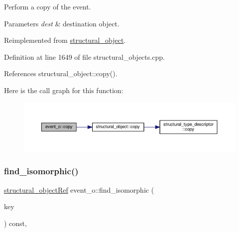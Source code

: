 Perform a copy of the event. 


\begin{DoxyParams}{Parameters}
{\em dest} & destination object. \\
\hline
\end{DoxyParams}


Reimplemented from \hyperlink{classstructural__object_a6566435c67934f6b4ff1b319c0682b18}{structural\+\_\+object}.



Definition at line 1649 of file structural\+\_\+objects.\+cpp.



References structural\+\_\+object\+::copy().

Here is the call graph for this function\+:
\nopagebreak
\begin{figure}[H]
\begin{center}
\leavevmode
\includegraphics[width=350pt]{d9/db0/classevent__o_acdd317b74f63cf9e7c5fe01aa5bbeb39_cgraph}
\end{center}
\end{figure}
\mbox{\label{classevent__o_ae1021e72b16d1d6259bd5f494780ba95}} 
\subsubsection{\texorpdfstring{find\+\_\+isomorphic()}{find\_isomorphic()}}
{\footnotesize\ttfamily \hyperlink{structural__objects_8hpp_a8ea5f8cc50ab8f4c31e2751074ff60b2}{structural\+\_\+object\+Ref} event\+\_\+o\+::find\+\_\+isomorphic (\begin{DoxyParamCaption}\item[{const \hyperlink{structural__objects_8hpp_a8ea5f8cc50ab8f4c31e2751074ff60b2}{structural\+\_\+object\+Ref}}]{key }\end{DoxyParamCaption}) const\hspace{0.3cm}{\ttfamily [override]}, {\ttfamily [virtual]}}



